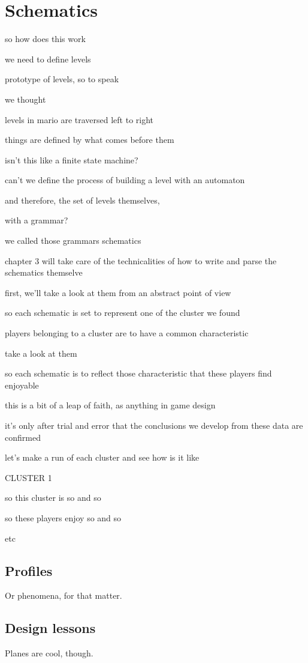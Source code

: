 \chapter{Schematics}

so how does this work

we need to define levels

prototype of levels, so to speak

we thought

levels in mario are traversed left to right

things are defined by what comes before them

isn't this like a finite state machine?

can't we define the process of building a level with an automaton

and therefore, the set of levels themselves,

with a grammar?

we called those grammars schematics

chapter 3 will take care of the technicalities of how to write and parse the schematics themselve

first, we'll take a look at them from an abstract point of view

so each schematic is set to represent one of the cluster we found

players belonging to a cluster are to have a common characteristic

take a look at them

so each schematic is to reflect those characteristic that these players find enjoyable

this is a bit of a leap of faith, as anything in game design

it's only after trial and error that the conclusions we develop from these data are confirmed

let's make a run of each cluster and see how is it like

CLUSTER 1

so this cluster is so and so

so these players enjoy so and so

etc

\section{Profiles}
Or phenomena, for that matter.

\section{Design lessons}

Planes are cool, though.